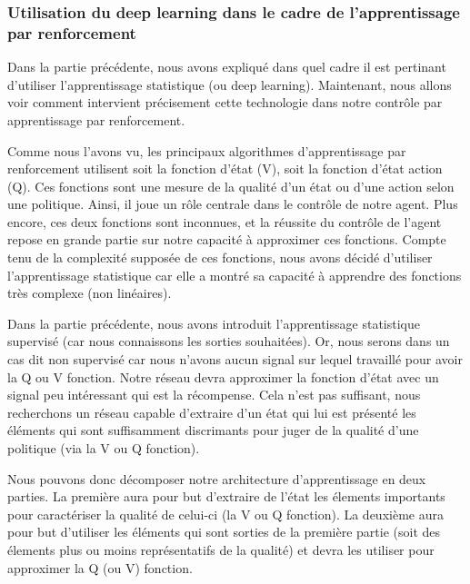 \subsubsection{Utilisation du deep learning dans le cadre de l'apprentissage par renforcement}

Dans la partie précédente, nous avons expliqué dans quel cadre il est pertinant d'utiliser l'apprentissage statistique (ou deep learning). Maintenant, nous allons voir comment intervient précisement cette technologie dans notre contrôle par apprentissage par renforcement. 

Comme nous l'avons vu, les principaux algorithmes d'apprentissage par renforcement utilisent soit la fonction d'état (V), soit la fonction d'état action (Q). Ces fonctions sont une mesure de la qualité d'un état ou d'une action selon une politique. Ainsi, il joue un rôle  centrale dans le contrôle de notre agent. Plus encore, ces deux fonctions sont inconnues, et la réussite du contrôle de l'agent repose en grande partie sur notre capacité à approximer ces fonctions. Compte tenu de la complexité supposée de ces fonctions, nous avons décidé d'utiliser l'apprentissage statistique car elle a montré sa capacité à apprendre des fonctions très complexe (non linéaires).

Dans la partie précédente, nous avons introduit l'apprentissage statistique supervisé (car nous connaissons les sorties souhaitées). Or, nous serons dans un cas dit non supervisé car nous n'avons aucun signal sur lequel travaillé pour avoir la Q ou V fonction. Notre réseau devra approximer la fonction d'état avec un signal peu intéressant qui est la récompense. Cela n'est pas suffisant, nous recherchons un réseau capable d'extraire d'un état qui lui est présenté les éléments qui sont suffisamment discrimants pour juger de la qualité d'une politique (via la V ou Q fonction).


Nous pouvons donc décomposer notre architecture d'apprentissage en deux parties. La première aura pour but d'extraire de l'état les élements importants pour caractériser la qualité de celui-ci (la V ou Q fonction). La deuxième aura pour but d'utiliser les éléments qui sont sorties de la première partie (soit des élements plus ou moins représentatifs de la qualité) et devra les utiliser pour approximer la Q (ou V) fonction.


